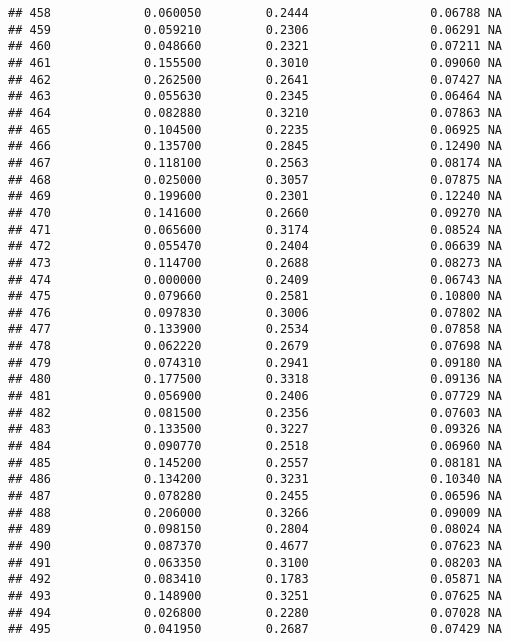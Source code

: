 \documentclass[
]{article}
\begin{document}
\begin{verbatim}
## 458             0.060050         0.2444                 0.06788 NA
## 459             0.059210         0.2306                 0.06291 NA
## 460             0.048660         0.2321                 0.07211 NA
## 461             0.155500         0.3010                 0.09060 NA
## 462             0.262500         0.2641                 0.07427 NA
## 463             0.055630         0.2345                 0.06464 NA
## 464             0.082880         0.3210                 0.07863 NA
## 465             0.104500         0.2235                 0.06925 NA
## 466             0.135700         0.2845                 0.12490 NA
## 467             0.118100         0.2563                 0.08174 NA
## 468             0.025000         0.3057                 0.07875 NA
## 469             0.199600         0.2301                 0.12240 NA
## 470             0.141600         0.2660                 0.09270 NA
## 471             0.065600         0.3174                 0.08524 NA
## 472             0.055470         0.2404                 0.06639 NA
## 473             0.114700         0.2688                 0.08273 NA
## 474             0.000000         0.2409                 0.06743 NA
## 475             0.079660         0.2581                 0.10800 NA
## 476             0.097830         0.3006                 0.07802 NA
## 477             0.133900         0.2534                 0.07858 NA
## 478             0.062220         0.2679                 0.07698 NA
## 479             0.074310         0.2941                 0.09180 NA
## 480             0.177500         0.3318                 0.09136 NA
## 481             0.056900         0.2406                 0.07729 NA
## 482             0.081500         0.2356                 0.07603 NA
## 483             0.133500         0.3227                 0.09326 NA
## 484             0.090770         0.2518                 0.06960 NA
## 485             0.145200         0.2557                 0.08181 NA
## 486             0.134200         0.3231                 0.10340 NA
## 487             0.078280         0.2455                 0.06596 NA
## 488             0.206000         0.3266                 0.09009 NA
## 489             0.098150         0.2804                 0.08024 NA
## 490             0.087370         0.4677                 0.07623 NA
## 491             0.063350         0.3100                 0.08203 NA
## 492             0.083410         0.1783                 0.05871 NA
## 493             0.148900         0.3251                 0.07625 NA
## 494             0.026800         0.2280                 0.07028 NA
## 495             0.041950         0.2687                 0.07429 NA

\end{verbatim}
\end{document}
